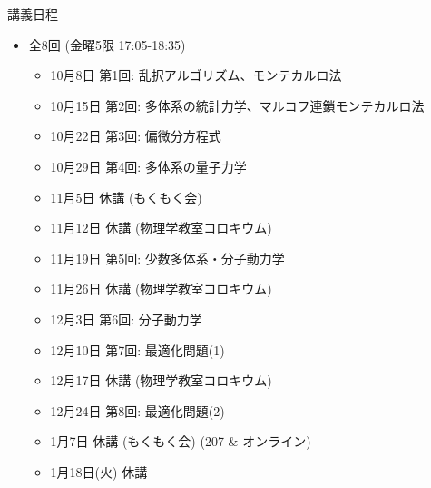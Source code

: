 \begin{frame}[t]{講義日程}
  \begin{itemize}
  \item 全8回 (金曜5限 {\color{red}17:05}-18:35)
    \begin{itemize}
    \item {\color{gray} 10月8日 第1回: 乱択アルゴリズム、モンテカルロ法}
    \item {\color{gray} 10月15日 第2回: 多体系の統計力学、マルコフ連鎖モンテカルロ法}
    \item {\color{gray} 10月22日 第3回: 偏微分方程式}
    \item {\color{gray} 10月29日 第4回: 多体系の量子力学}
    \item {\color{gray} 11月5日 休講 (もくもく会)}
    \item {\color{gray} 11月12日 休講 (物理学教室コロキウム)}
    \item {\color{gray} 11月19日 第5回: 少数多体系・分子動力学}
    \item {\color{gray} 11月26日 休講 (物理学教室コロキウム)}
    \item {\color{gray} 12月3日 第6回: 分子動力学}
    \item {\color{gray} 12月10日 第7回: 最適化問題(1)}
    \item {\color{gray} 12月17日 休講 (物理学教室コロキウム)}
    \item {\color{gray} 12月24日 第8回: 最適化問題(2)}
    \item 1月7日 休講 (もくもく会) (207 \& オンライン)
    \item {\color{gray} 1月18日(火) 休講}
    \end{itemize}
  \end{itemize}
\end{frame}
